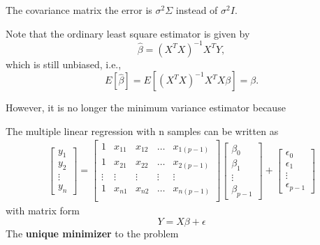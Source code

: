 \begin{refsection}
\begin{remark}
The covariance matrix the error is $\sigma^2 \Sigma$ instead of $\sigma^2I$.	
\end{remark}

\begin{note}
Note that the ordinary least square estimator is given by
$$\hat{\beta} = (X^TX)^{-1}X^TY,$$
which is still unbiased, i.e., $$E[\hat{\beta}] = E[(X^TX)^{-1}X^TX\beta] = \beta.$$

However, it is no longer the minimum variance estimator because
	
\end{note}



\begin{theorem}\label{ch:statistical-models:th:GeneralizedLeastSquareSolution}
	The multiple linear regression with n samples can be written as
	\begin{align*}
	\begin{bmatrix}
	y_1\\
	y_2\\
	\vdots\\
	y_n
	\end{bmatrix} = \begin{bmatrix}
	1 & x_{11} & x_{12} & \dots & x_{1(p-1)}\\
	1 & x_{21} & x_{22} & \dots & x_{2(p-1)}\\
	\vdots & \vdots & \vdots & \vdots & \vdots \\
	1 & x_{n1} & x_{n2} & \dots & x_{n(p-1)}\\
	\end{bmatrix}
	\begin{bmatrix}
	\beta_0\\
	\beta_1\\
	\vdots\\
	\beta_{p-1}
	\end{bmatrix}
	+ \begin{bmatrix}
	\epsilon_0\\
	\epsilon_1\\
	\vdots\\
	\epsilon_{p-1}
	\end{bmatrix}
	\end{align*}
	with matrix form
	$$Y = X\beta + \epsilon$$
	The \textbf{unique minimizer} to the problem 

\end{theorem}
\end{refsection}
